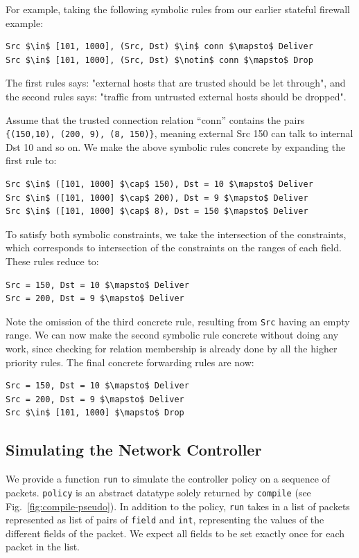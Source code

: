 \documentclass[nocopyrightspace]{sigplanconf}
\begin{document}
For example, taking the following symbolic rules from our earlier stateful firewall example: 
  \begin{lstlisting}[mathescape]
Src $\in$ [101, 1000], (Src, Dst) $\in$ conn $\mapsto$ Deliver
Src $\in$ [101, 1000], (Src, Dst) $\notin$ conn $\mapsto$ Drop
  \end{lstlisting}
The first rules says: "external hosts that are trusted should be let through", and the second rules says: "traffic from untrusted external hosts should be dropped".
  
  Assume that the trusted connection relation ``conn'' contains the pairs 
  \lstinline| {(150,10), (200, 9), (8, 150)}|, meaning external Src 150 can talk to internal Dst 10 and so on. We make the above symbolic rules concrete by expanding the first rule to:
\begin{lstlisting}[mathescape]
Src $\in$ ([101, 1000] $\cap$ 150), Dst = 10 $\mapsto$ Deliver
Src $\in$ ([101, 1000] $\cap$ 200), Dst = 9 $\mapsto$ Deliver
Src $\in$ ([101, 1000] $\cap$ 8), Dst = 150 $\mapsto$ Deliver
 \end{lstlisting}
To satisfy both symbolic constraints, we take the intersection of the constraints, which corresponds to intersection of the constraints on the ranges of each field. These rules reduce to:
\begin{lstlisting}[mathescape]
Src = 150, Dst = 10 $\mapsto$ Deliver
Src = 200, Dst = 9 $\mapsto$ Deliver
 \end{lstlisting}
Note the omission of the third concrete rule, resulting from \lstinline|Src| having an empty range. We can now make the second symbolic rule concrete without doing any work, since checking for relation membership is already done by all the higher priority rules. The final concrete forwarding rules are now:
\begin{lstlisting}[mathescape]
Src = 150, Dst = 10 $\mapsto$ Deliver
Src = 200, Dst = 9 $\mapsto$ Deliver
Src $\in$ [101, 1000] $\mapsto$ Drop
\end{lstlisting}

\subsection*{Simulating the Network Controller}

We provide a function \lstinline|run| to simulate the controller policy on a sequence of packets. \lstinline|policy| is an abstract datatype solely returned by \lstinline|compile| (see Fig.~\ref{fig:compile-pseudo}). In addition to the policy, \lstinline|run| takes in a list of packets represented as list of pairs of \lstinline|field| and \lstinline|int|, representing the values of the different fields of the packet. We expect all fields to be set exactly once for each packet in the list.
\end{document}
